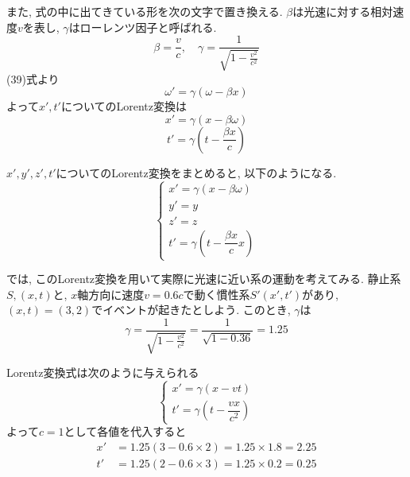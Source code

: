 \documentclass{ltjsarticle}
\begin{document}
また, 式の中に出てきている形を次の文字で置き換える. 
$\beta$は光速に対する相対速度$v$を表し, $\gamma$はローレンツ因子と呼ばれる. 
\begin{equation}
  \beta = \frac{v}{c}, \quad \gamma = \frac{1}{\sqrt{1 - \frac{v^2}{c^2}}}
\end{equation}
(39)式より
\begin{equation}
  \omega' = \gamma (\omega - \beta x)
\end{equation}
よって$x', t'$についてのLorentz変換は
\begin{equation}
  x' = \gamma (x - \beta \omega)
\end{equation}
\begin{equation}
  t' = \gamma \left( t - \dfrac{\beta x}{c}  \right)
\end{equation}

% 
$x', y', z', t'$についてのLorentz変換をまとめると, 以下のようになる. 
\begin{equation}
\begin{cases}
x' = \gamma (x - \beta \omega) \\
y' = y \\
z' = z \\
t' = \gamma \left( t - \dfrac{\beta x}{c} x \right)
\end{cases}
\end{equation}

では, このLorentz変換を用いて実際に光速に近い系の運動を考えてみる. 
静止系$S, (x, t)$と, $x$軸方向に速度$v = 0.6c$で動く慣性系$S'(x', t')$があり, $(x, t)= (3, 2)$でイベントが起きたとしよう. 
このとき, $\gamma$は
\begin{equation}
  \gamma = \frac{1}{\sqrt{1 - \frac{v^2}{c^2}}} = \frac{1}{\sqrt{1 - 0.36}} = 1.25
\end{equation}

Lorentz変換式は次のように与えられる
\begin{equation}
\begin{cases}
x' = \gamma (x - vt) \\
t' = \gamma \left( t - \dfrac{v x}{c^2} \right)
\end{cases}
\end{equation}
よって$c=1$として各値を代入すると
\begin{equation}
\begin{aligned}
x' &= 1.25 (3 - 0.6 \times 2) = 1.25 \times 1.8 = 2.25 \\
t' &= 1.25 (2 - 0.6 \times 3) = 1.25 \times 0.2 = 0.25
\end{aligned}
\end{equation}
\end{document}
